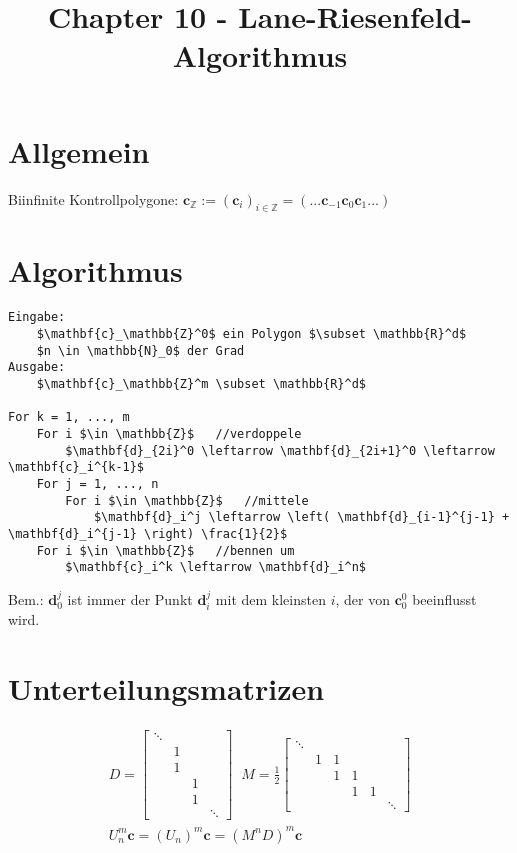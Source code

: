 \documentclass[8pt, DIV15, twocolumn]{scrartcl}
\title{Chapter 10 - Lane-Riesenfeld-Algorithmus}
\date{}
\begin{document}
\setlength{\abovedisplayskip}{0pt}
\setlength{\belowdisplayskip}{0pt}
\setlength{\parskip}{0pt}
\setlength{\topmargin}{0pt}

 
\maketitle

\thispagestyle{empty}

\section*{Allgemein}
Biinfinite Kontrollpolygone: $\mathbf{c}_\mathbb{Z} := \left( \mathbf{c}_i \right)_{i \in \mathbb{Z}} = \left( ... \mathbf{c}_{-1} \mathbf{c}_0 \mathbf{c}_1 ... \right)$

\section*{Algorithmus}

\begin{lstlisting}[mathescape=true]
Eingabe:
	$\mathbf{c}_\mathbb{Z}^0$ ein Polygon $\subset \mathbb{R}^d$
	$n \in \mathbb{N}_0$ der Grad
Ausgabe:
	$\mathbf{c}_\mathbb{Z}^m \subset \mathbb{R}^d$

For k = 1, ..., m
	For i $\in \mathbb{Z}$   //verdoppele
		$\mathbf{d}_{2i}^0 \leftarrow \mathbf{d}_{2i+1}^0 \leftarrow \mathbf{c}_i^{k-1}$
	For j = 1, ..., n
		For i $\in \mathbb{Z}$   //mittele
			$\mathbf{d}_i^j \leftarrow \left( \mathbf{d}_{i-1}^{j-1} + \mathbf{d}_i^{j-1} \right) \frac{1}{2}$
	For i $\in \mathbb{Z}$   //bennen um
		$\mathbf{c}_i^k \leftarrow \mathbf{d}_i^n$
\end{lstlisting}

Bem.: $\mathbf{d}_0^j$ ist immer der Punkt $\mathbf{d}_i^j$ mit dem kleinsten $i$, der von $\mathbf{c}_0^0$ beeinflusst wird.

\section*{Unterteilungsmatrizen}

\begin{equation*}
\begin{aligned}
D = 
\begin{bmatrix}
\ddots & & & \\
& 1 & & \\
& 1 & & \\ 
& & 1 & \\
& & 1 & \\
& & & \ddots
\end{bmatrix} \; \;
M = \frac{1}{2}
\begin{bmatrix}
\ddots & & & & & \\
& 1 & 1 & & & \\
& & 1 & 1 & & \\
& & & 1 & 1 & \\
& & & & & \ddots
\end{bmatrix} \\ 
U_n^m \mathbf{c} = \left( U_n \right)^m \mathbf{c} = \left( M^n D \right)^m \mathbf{c}
\end{aligned}
\end{equation*}
\end{document}
